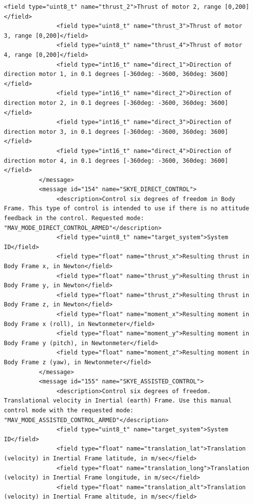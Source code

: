 \begin{lstlisting}[captionpos=b, caption="Definition of \textsc{Skye} specific Mavlink messages", label=app_xml]
               <field type="uint8_t" name="thrust_2">Thrust of motor 2, range [0,200]</field>
               <field type="uint8_t" name="thrust_3">Thrust of motor 3, range [0,200]</field>
               <field type="uint8_t" name="thrust_4">Thrust of motor 4, range [0,200]</field>
               <field type="int16_t" name="direct_1">Direction of direction motor 1, in 0.1 degrees [-360deg: -3600, 360deg: 3600] </field>
               <field type="int16_t" name="direct_2">Direction of direction motor 2, in 0.1 degrees [-360deg: -3600, 360deg: 3600] </field>
               <field type="int16_t" name="direct_3">Direction of direction motor 3, in 0.1 degrees [-360deg: -3600, 360deg: 3600] </field>
               <field type="int16_t" name="direct_4">Direction of direction motor 4, in 0.1 degrees [-360deg: -3600, 360deg: 3600] </field>
          </message>
          <message id="154" name="SKYE_DIRECT_CONTROL">
               <description>Control six degrees of freedom in Body Frame. This type of control is intended to use if there is no attitude feedback in the control. Requested mode: "MAV_MODE_DIRECT_CONTROL_ARMED"</description>
               <field type="uint8_t" name="target_system">System ID</field>
               <field type="float" name="thrust_x">Resulting thrust in Body Frame x, in Newton</field>
               <field type="float" name="thrust_y">Resulting thrust in Body Frame y, in Newton</field>
               <field type="float" name="thrust_z">Resulting thrust in Body Frame z, in Newton</field>
               <field type="float" name="moment_x">Resulting moment in Body Frame x (roll), in Newtonmeter</field>
               <field type="float" name="moment_y">Resulting moment in Body Frame y (pitch), in Newtonmeter</field>
               <field type="float" name="moment_z">Resulting moment in Body Frame z (yaw), in Newtonmeter</field>
          </message>
          <message id="155" name="SKYE_ASSISTED_CONTROL">
               <description>Control six degrees of freedom. Translational velocity in Inertial (earth) Frame. Use this manual control mode with the requested mode: "MAV_MODE_ASSISTED_CONTROL_ARMED"</description>
               <field type="uint8_t" name="target_system">System ID</field>
               <field type="float" name="translation_lat">Translation (velocity) in Inertial Frame latitude, in m/sec</field>
               <field type="float" name="translation_long">Translation (velocity) in Inertial Frame longitude, in m/sec</field>
               <field type="float" name="translation_alt">Translation (velocity) in Inertial Frame altitude, in m/sec</field>

\end{lstlisting}
